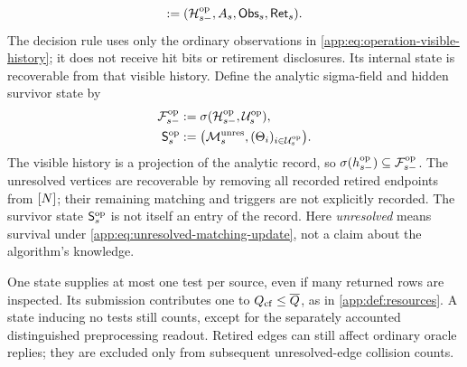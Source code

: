 \begin{definition*}
\begin{equation}
 :=(\mathcal H^{\mathrm{op}}_{s-},A_s,\mathsf{Obs}_{s},\mathsf{Ret}_{s}).
 \label{app:eq:analytic-record-update}
\end{equation}
The decision rule uses only the ordinary observations in
\cref{app:eq:operation-visible-history}; it does not receive hit bits
or retirement disclosures. Its internal state is recoverable from that
visible history. Define the analytic sigma-field and hidden survivor state by
\begin{equation}
 \begin{aligned}
 \mathcal F^{\mathrm{op}}_{s-}
   &:=\sigma(\mathcal H^{\mathrm{op}}_{s-},\mathcal U^{\mathrm{op}}_{s}),\\
 \mathsf S^{\mathrm{op}}_{s}
   &:=\bigl(\mathcal M_{s}^{\mathrm{unres}},
          (\Theta_{i})_{i\in\mathcal U^{\mathrm{op}}_{s}}\bigr).
 \end{aligned}
 \label{app:eq:analytic-field-and-survivor}
\end{equation}
The visible history is a projection of the analytic record, so
\(\sigma(h^{\mathrm{op}}_{s-})\subseteq\mathcal F^{\mathrm{op}}_{s-}\).
The unresolved vertices are recoverable by removing all recorded retired
endpoints from \([N]\); their remaining matching and triggers
are not explicitly recorded. The survivor state \(\mathsf S^{\mathrm{op}}_{s}\)
is not itself an entry of the record.
Here \emph{unresolved} means survival under
\cref{app:eq:unresolved-matching-update}, not a claim about the
algorithm's knowledge.
\end{definition*}

One state supplies at most one test per source, even if many returned rows
are inspected. Its submission contributes one to
\(Q_{\mathrm{cf}}\le\overline Q{}\), as in
\textcolor{red}{\cref{app:def:resources}}. A state inducing no tests still counts,
except for the separately accounted distinguished preprocessing readout.
Retired edges can still affect ordinary oracle replies; they are excluded
only from subsequent unresolved-edge collision counts.

